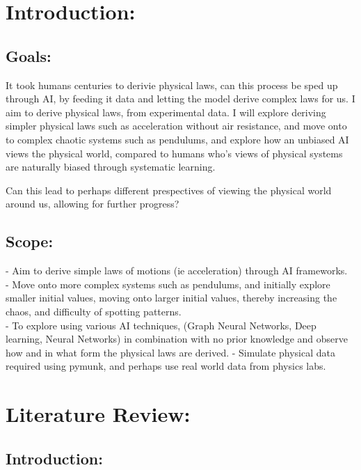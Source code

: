 \documentclass{article}
\begin{document}
\section{Introduction: }

\subsection{Goals: }

It took humans centuries to derivie physical laws, can this process be sped up through AI, by feeding it data and letting the model derive complex laws for us. I aim to derive physical laws, from experimental data. I will explore deriving simpler physical laws such as acceleration without air resistance, and move onto to complex chaotic systems such as pendulums, and explore how an unbiased AI views the physical world, compared to humans who's views of physical systems are naturally biased through systematic learning. 

Can this lead to perhaps different prespectives of viewing the physical world around us, allowing for further progress? 


\subsection{Scope: }


 - Aim to derive simple laws of motions (ie acceleration) through AI frameworks.\\ 

- Move onto more complex systems such as pendulums, and initially explore smaller initial values, moving onto larger initial values, 
thereby increasing the chaos, and difficulty of spotting patterns. \\

- To explore using various AI techniques, (Graph Neural Networks, Deep learning, Neural Networks) in combination with no prior knowledge and observe how and in what form the physical laws are derived.  
- Simulate physical data required using pymunk, and perhaps use real world data from physics labs.\\ 

\section{Literature Review: }

\subsection{ Introduction: }
\end{document}
